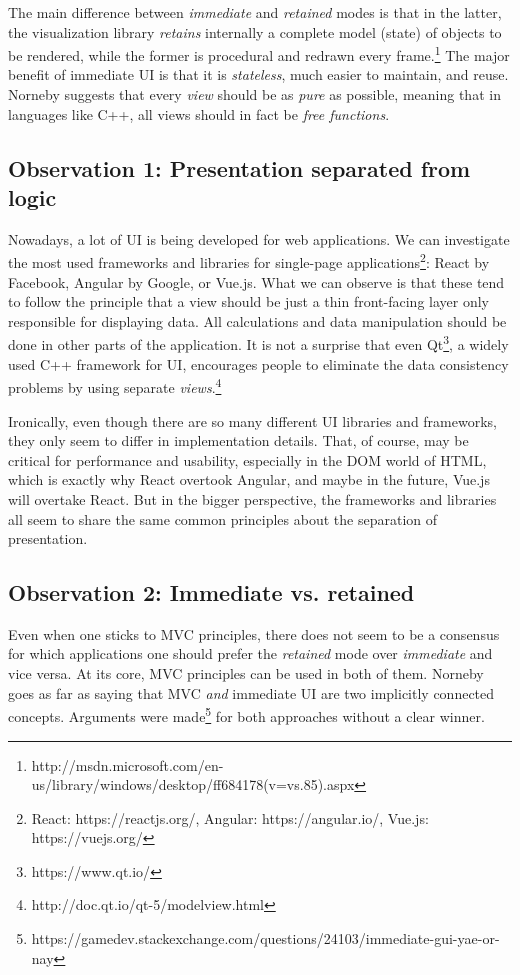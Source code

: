 The main difference between \emph{immediate} and \emph{retained} modes is that in the latter, the visualization library \emph{retains} internally a complete model (state) of objects to be rendered, while the former is procedural and redrawn every frame.\footnote{http://msdn.microsoft.com/en-us/library/windows/desktop/ff684178(v=vs.85).aspx}
The major benefit of immediate UI is that it is \emph{stateless}, much easier to maintain, and reuse.
Norneby suggests that every \emph{view} should be as \emph{pure} as possible, meaning that in languages like C++, all views should in fact be \emph{free functions}.

\subsection{Observation 1: Presentation separated from logic}

Nowadays, a lot of UI is being developed for web applications.
We can investigate the most used frameworks and libraries for single-page applications\footnote{React: https://reactjs.org/, Angular: https://angular.io/, Vue.js: https://vuejs.org/}: React by Facebook, Angular by Google, or Vue.js.
What we can observe is that these tend to follow the principle that a view should be just a thin front-facing layer only responsible for displaying data.
All calculations and data manipulation should be done in other parts of the application.
It is not a surprise that even Qt\footnote{https://www.qt.io/}, a widely used C++ framework for UI, encourages people to eliminate the data consistency problems by using separate \emph{views}.\footnote{http://doc.qt.io/qt-5/modelview.html}

Ironically, even though there are so many different UI libraries and frameworks, they only seem to differ in implementation details.
That, of course, may be critical for performance and usability, especially in the DOM world of HTML, which is exactly why React overtook Angular, and maybe in the future, Vue.js will overtake React.
But in the bigger perspective, the frameworks and libraries all seem to share the same common principles about the separation of presentation.

\subsection{Observation 2: Immediate vs. retained}

Even when one sticks to MVC principles, there does not seem to be a consensus for which applications one should prefer the \emph{retained} mode over \emph{immediate} and vice versa.
At its core, MVC principles can be used in both of them.
Norneby goes as far as saying that MVC \emph{and} immediate UI are two implicitly connected concepts.
Arguments were made\footnote{https://gamedev.stackexchange.com/questions/24103/immediate-gui-yae-or-nay} for both approaches without a clear winner.


